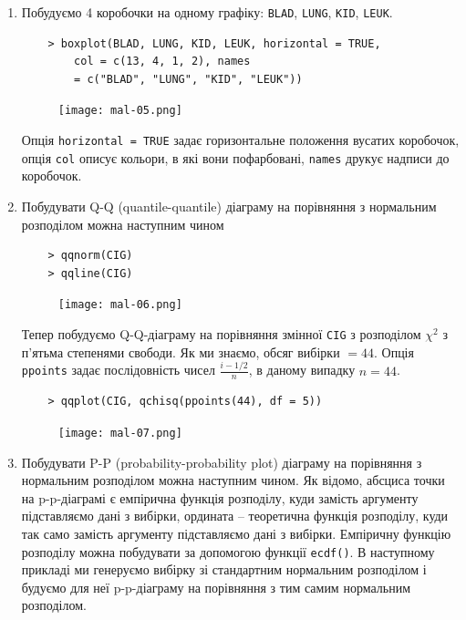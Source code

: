 \documentclass[a4paper, 12pt]{article}
\begin{document}
\begin{enumerate}
	\item Побудуємо 4 коробочки на одному графіку: \verb|BLAD|, \verb|LUNG|, \verb|KID|, \verb|LEUK|.

	\begin{verbatim}
	> boxplot(BLAD, LUNG, KID, LEUK, horizontal = TRUE, 
		col = c(13, 4, 1, 2), names 
		= c("BLAD", "LUNG", "KID", "LEUK"))
	\end{verbatim}

	\begin{figure}[H]
		\centering
		\texttt{[image: mal-05.png]}
	\end{figure}

	Опція \verb|horizontal = TRUE| задає горизонтальне положення вусатих коробочок, опція \verb|col| описує кольори, в які вони пофарбовані, \verb|names| друкує надписи до коробочок.

	\item Побудувати Q-Q (quantile-quantile) діаграму на порівняння з нормальним розподілом можна наступним чином

	\begin{verbatim}
	> qqnorm(CIG)
	> qqline(CIG)
	\end{verbatim}
	
	\begin{figure}[H]
		\centering
		\texttt{[image: mal-06.png]}
	\end{figure}
	
	Тепер побудуємо Q-Q-діаграму на порівняння змінної \verb|CIG| з розподілом $\chi^2$ з п’ятьма степенями свободи. Як ми знаємо, обсяг вибірки $= 44$. Опція \verb|ppoints| задає послідовність чисел $\frac{i - 1/2}{n}$, в даному випадку $n = 44$.
	
	\begin{verbatim}
	> qqplot(CIG, qchisq(ppoints(44), df = 5))
	\end{verbatim}
	
	\begin{figure}[H]
		\centering
		\texttt{[image: mal-07.png]}
	\end{figure}
	
	\item Побудувати P-P (probability-probability plot) діаграму на порівняння з нормальним розподілом можна наступним чином. Як відомо, абсциса точки на p-p-діаграмі є емпірична функція розподілу, куди замість аргументу підставляємо дані з вибірки, ордината -- теоретична функція розподілу, куди так само замість аргументу підставляємо дані з вибірки. Емпіричну функцію розподілу можна побудувати за допомогою функції \verb|ecdf()|. В наступному прикладі ми генеруємо вибірку зі стандартним нормальним розподілом і будуємо для неї p-p-діаграму на порівняння з тим самим нормальним розподілом.
	

\end{enumerate}
\end{document}
